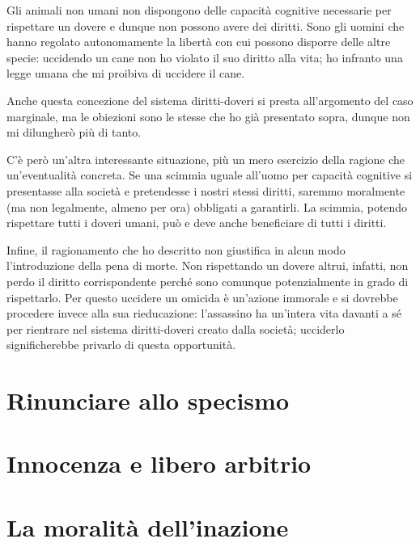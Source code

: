 \documentclass[a4paper,11pt,oneside,article]{memoir}
\begin{document}
Gli animali non umani non dispongono delle capacità cognitive necessarie per
rispettare un dovere e dunque non possono avere dei diritti. Sono gli uomini che
hanno regolato autonomamente la libertà con cui possono disporre delle altre
specie: uccidendo un cane non ho violato il suo diritto alla vita; ho infranto
una legge umana che mi proibiva di uccidere il cane.

Anche questa concezione del sistema diritti-doveri si presta all'argomento del
caso marginale, ma le obiezioni sono le stesse che ho già presentato sopra,
dunque non mi dilungherò più di tanto.

C'è però un'altra interessante situazione, più un mero esercizio della ragione
che un'eventualità concreta. Se una scimmia uguale all'uomo per capacità
cognitive si presentasse alla società e pretendesse i nostri stessi diritti,
saremmo moralmente (ma non legalmente, almeno per ora) obbligati a garantirli.
La scimmia, potendo rispettare tutti i doveri umani, può e deve anche
beneficiare di tutti i diritti.

Infine, il ragionamento che ho descritto non giustifica in alcun modo
l'introduzione della pena di morte. Non rispettando un dovere altrui, infatti,
non perdo il diritto corrispondente perché sono comunque potenzialmente in grado
di rispettarlo. Per questo uccidere un omicida è un'azione immorale e si
dovrebbe procedere invece alla sua rieducazione: l'assassino ha un'intera vita
davanti a sé per rientrare nel sistema diritti-doveri creato dalla società;
ucciderlo significherebbe privarlo di questa opportunità.

\chapter{Rinunciare allo specismo}


\chapter{Innocenza e libero arbitrio}


\chapter{La moralità dell'inazione}


\end{document}
